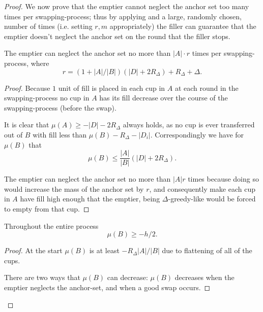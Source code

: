 \begin{proof}
We now prove that the emptier cannot neglect the anchor set too
many times per swapping-process; thus by applying \randalg and
\flatalg a large, randomly chosen, number of times (i.e. setting
$r, m$ appropriately) the filler can guarantee that the emptier
doesn't neglect the anchor set on the round that the filler stops.

\begin{clm}
  \label{clm:emptierCantNeglectAnchorTooMuch}
  The emptier can neglect the anchor set no more than $|A| \cdot
  r$ times per swapping-process, where 
  $$r = (1+|A|/|B|)(|D| + 2R_\Delta) + R_\Delta + \Delta.$$
\end{clm}
\begin{proof}

  Because $1$ unit of fill is placed in each cup in $A$ at each
  round in the swapping-process no cup in $A$ has its fill
  decrease over the course of the swapping-process (before the
  swap).

  It is clear that $\mu(A) \ge -|D| -2R_\Delta$ always holds,
  as no cup is ever transferred out of $B$ with fill less than
  $\mu(B) - R_\Delta -|D_i|$. Correspondingly we have for
  $\mu(B)$ that $$\mu(B) \le \frac{|A|}{|B|}(|D| + 2R_\Delta).$$

  The emptier can neglect the anchor set no more than $|A|r$
  times because doing so would increase the mass of the anchor
  set by $r$, and consequently make each cup in $A$ have fill
  high enough that the emptier, being $\Delta$-greedy-like would
  be forced to empty from that cup.
\end{proof}

\begin{clm}
  \label{clm:muBdoesntSinkTooLow}
  Throughout the entire process
  $$\mu(B) \ge -h/2.$$
\end{clm}
\begin{proof}

  At the start $\mu(B)$ is at least $-R_\Delta |A|/|B|$ due to flattening
  of all of the cups.

  There are two ways that $\mu(B)$ can decrease: $\mu(B)$
  decreases when the emptier neglects the anchor-set, and
  when a good swap occurs. 


\end{proof}
\end{proof}
